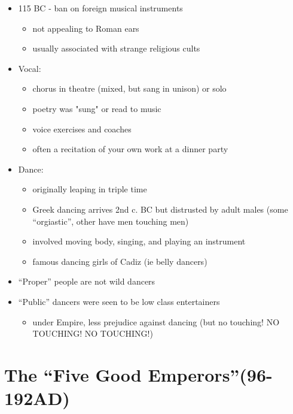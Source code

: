 \documentclass[12pt, twoside]{article}
\begin{document}
\begin{itemize}
\begin{itemize}
	\end{itemize}
\item 115 BC - ban on foreign musical instruments
	\begin{itemize}
	\item not appealing to Roman ears
	\item usually associated with strange religious cults
	\end{itemize}
\item Vocal:
	\begin{itemize}
	\item chorus in theatre (mixed, but sang in unison) or solo
	\item poetry was "sung" or read to music
	\item voice exercises and coaches
	\item often a recitation of your own work at a dinner party
	\end{itemize}
\item Dance:
	\begin{itemize}
	\item originally leaping in triple time
	\item Greek dancing arrives 2nd c. BC but distrusted by adult males (some “orgiastic”, other have men touching men)
	\item involved moving body, singing, and playing an instrument
	\item famous dancing girls of Cadiz (ie belly dancers)
	\end{itemize}
\item “Proper” people are not wild dancers
\item “Public” dancers were seen to be low class entertainers
	\begin{itemize}
	\item under Empire, less prejudice against dancing (but no touching! NO TOUCHING! NO TOUCHING!)
	\end{itemize}
\end{itemize}

\section{The ``Five Good Emperors''(96-192AD)}
\end{document}

